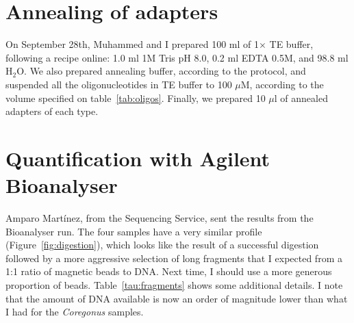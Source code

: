 \documentclass[a4paper,12pt]{article}
\begin{document}
\section{Annealing of adapters}
On September 28th, Muhammed and I prepared 100 ml of 1$\times$ TE buffer, following a recipe online: 1.0 ml 1M Tris pH 8.0, 0.2 ml EDTA 0.5M, and 98.8 ml H$_2$O. We also prepared annealing buffer, according to the protocol, and suspended all the oligonucleotides in TE buffer to 100 $\mu$M, according to the volume specified on table~\ref{tab:oligos}. Finally, we prepared 10 $\mu$l of annealed adapters of each type.

\section{Quantification with Agilent Bioanalyser}
Amparo Martínez, from the Sequencing Service, sent the results from the Bioanalyser run. The four samples have a very similar profile (Figure~\ref{fig:digestion}), which looks like the result of a successful digestion followed by a more aggressive selection of long fragments that I expected from a 1:1 ratio of magnetic beads to DNA. Next time, I should use a more generous proportion of beads. Table~\ref{tau:fragments} shows some additional details. I note that the amount of DNA available is now an order of magnitude lower than what I had for the \emph{Coregonus} samples.
\end{document}
